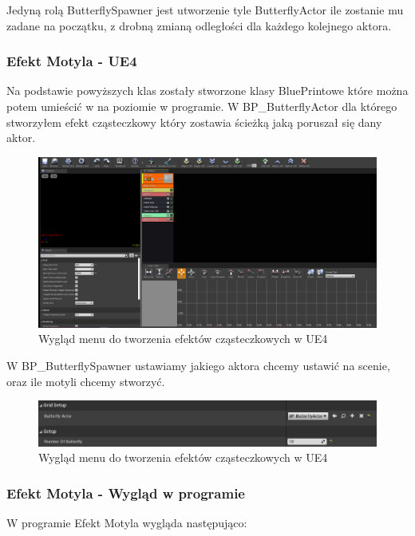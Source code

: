 \documentclass[a4paper,12pt,reqno]{article}
\begin{document}


Jedyną rolą ButterflySpawner jest utworzenie tyle ButterflyActor ile zostanie mu zadane na początku, z drobną zmianą odległości dla każdego kolejnego aktora.




\subsubsection{Efekt Motyla - UE4}

Na podstawie powyższych klas zostały stworzone klasy BluePrintowe które można potem umieścić w na poziomie w programie. W BP\_ButterflyActor dla którego stworzyłem efekt cząsteczkowy który zostawia ścieżką jaką poruszał się dany aktor.

\begin{figure}[H]%
\centering
\includegraphics[width=0.7\columnwidth]{graphics/butterfly/ButterflyParticleSystem.png}
\caption{Wygląd menu do tworzenia efektów cząsteczkowych w UE4 
\label{BPExample}}%
%
\qquad
\end{figure} 


W BP\_ButterflySpawner ustawiamy jakiego aktora chcemy ustawić na scenie, oraz ile motyli chcemy stworzyć.

\begin{figure}[H]%
\centering
\includegraphics[width=0.7\columnwidth]{graphics/butterfly/ButterflySpawner.png}
\caption{Wygląd menu do tworzenia efektów cząsteczkowych w UE4 
\label{BPExample}}%
%
\qquad
\end{figure} 



\subsubsection{Efekt Motyla - Wygląd w programie}
W programie Efekt Motyla wygląda następująco:
\end{document}
